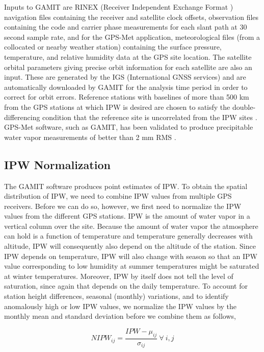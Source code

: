 \documentclass[proposal]{umassthesis}
\begin{document}
Inputs to GAMIT are RINEX (Receiver Independent Exchange Format \cite{gurtner2007rinex}) navigation files containing the receiver and satellite clock offsets, observation files containing the code and carrier phase measurements for each slant path at 30 second sample rate, and for the GPS-Met application, meteorological files (from a collocated or nearby weather station) containing the surface pressure, temperature, and relative humidity data at the GPS site location. The satellite orbital parameters giving precise orbit information for each satellite are also an input. These are generated by the IGS (International GNSS services) \cite{dow2009international} and are automatically downloaded by GAMIT for the analysis time period in order to correct for orbit errors. Reference stations with baselines of more than 500 km from the GPS stations at which IPW is desired are chosen to satisfy the double-differencing condition that the reference site is uncorrelated from the IPW sites \cite{rocken1995gps}. GPS-Met software, such as GAMIT, has been validated to produce precipitable water vapor measurements of better than 2 mm RMS \cite{duan1996gps}.

\subsection{IPW Normalization}

The GAMIT software produces point estimates of IPW. To obtain the spatial distribution of IPW, we need to combine IPW values from multiple GPS receivers. Before we can do so, however, we first need to normalize the IPW values from the different GPS stations. IPW is the amount of water vapor in a vertical column over the site. Because the amount of water vapor the atmosphere can hold is a function of temperature and temperature generally decreases with altitude, IPW will consequently also depend on the altitude of the station. Since IPW depends on temperature, IPW will also change with season so that an IPW value corresponding to low humidity at summer temperatures might be saturated at winter temperatures. Moreover, IPW by itself does not tell the level of saturation, since again that depends on the daily temperature. To account for station height differences, seasonal (monthly) variations, and to identify anomalously high or low IPW values, we normalize the IPW values by the monthly mean and standard deviation before we combine them as follows,

\begin{equation}
NIPW_{ij} = \dfrac{IPW - \mu_{ij}}{\sigma_{ij}} \ \forall \ i,j
\end{equation}
\end{document}
